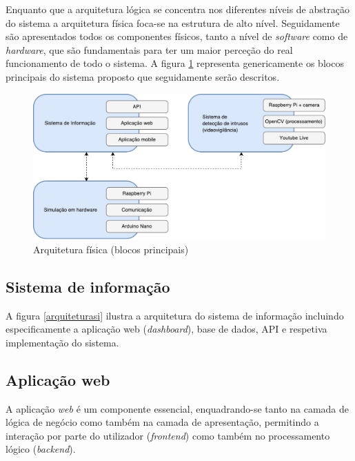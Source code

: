 Enquanto que a arquitetura lógica se concentra nos diferentes níveis de abstração do sistema a arquitetura física foca-se na estrutura de alto nível.  
Seguidamente são apresentados todos os componentes físicos, tanto  a nível de \textit{software} como de \textit{hardware}, que são fundamentais para ter um maior perceção do real funcionamento de todo o sistema. 
A figura \ref{fisicablocos} representa genericamente os blocos principais do sistema proposto que seguidamente serão descritos. 


\begin{figure}[h]
	\centering
	\includegraphics[scale=0.51]{esquemas/esquema-blocos.pdf}
	\caption{Arquitetura física (blocos principais)}
	\label{fisicablocos}
\end{figure}


  
\subsection{Sistema de informação}




A figura \ref{arquiteturasi} ilustra a arquitetura do sistema de informação incluindo especificamente a aplicação web (\textit{dashboard}), base de dados, \acs{API}   e respetiva implementação do sistema. 





\subsection{Aplicação web}

A aplicação \textit{web} é um componente essencial, enquadrando-se tanto na camada de lógica de negócio como também na camada de apresentação, permitindo a interação por parte do utilizador (\textit{frontend}) como também no processamento lógico (\textit{backend}).   

